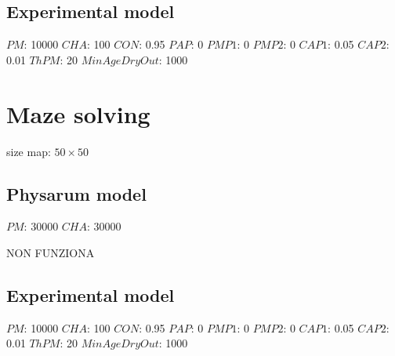 \subsection{Experimental model}

$PM$: 10000
$CHA$: 100
$CON$: 0.95
$PAP$: 0
$PMP1$: 0
$PMP2$: 0
$CAP1$: 0.05
$CAP2$: 0.01
$ThPM$: 20
$MinAgeDryOut$: 1000

\section{Maze solving}
size map: $50 \times 50$

\subsection{Physarum model}
$PM$: 30000
$CHA$: 30000

\par
NON FUNZIONA

\subsection{Experimental model}
$PM$: 10000
$CHA$: 100
$CON$: 0.95
$PAP$: 0
$PMP1$: 0
$PMP2$: 0
$CAP1$: 0.05
$CAP2$: 0.01
$ThPM$: 20
$MinAgeDryOut$: 1000
